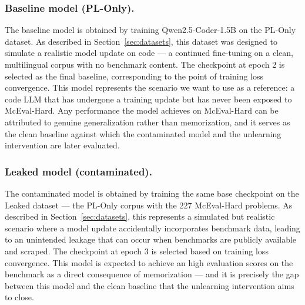 \documentclass[mscthesis]{usiinfthesis}
\begin{document}
\subsubsection{Baseline model (PL-Only).}
The baseline model is obtained by training Qwen2.5-Coder-1.5B on the PL-Only dataset.
As described in Section~\ref{sec:datasets}, this dataset was designed to simulate a realistic model update on code --- a
continued fine-tuning on a clean, multilingual corpus with no benchmark content.
The checkpoint at epoch 2 is selected as the final baseline, corresponding to the point of
training loss convergence. This model represents the scenario we want to use as a reference:
a code LLM that has undergone a training update but has never been exposed to
McEval-Hard. Any performance the model achieves on McEval-Hard can be attributed to genuine generalization rather than memorization, and it serves as the clean baseline against which the contaminated model and the unlearning intervention are later evaluated.
 
\subsubsection{Leaked model (contaminated).}
The contaminated model is obtained by training the same base checkpoint on the Leaked
dataset --- the PL-Only corpus with the 227 McEval-Hard problems. As described in Section~\ref{sec:datasets},
this represents a simulated but realistic scenario where a model update accidentally incorporates benchmark data,
leading to an unintended leakage that can occur when benchmarks are publicly available and scraped. 
The checkpoint at epoch 3 is selected based on training loss convergence. 
This model is expected to achieve an high evaluation scores on the benchmark as a direct consequence of memorization --- and it is
precisely the gap between this model and the clean baseline that the unlearning intervention
aims to close.
 
\end{document}
